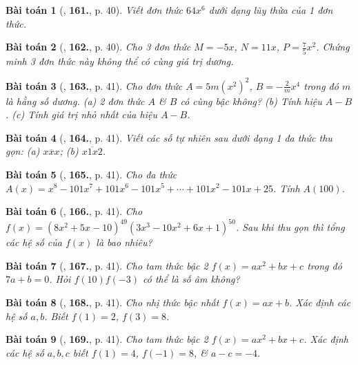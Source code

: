 \documentclass{article}
\numberwithin{equation}{section}
\newtheorem{baitoan}{Bài toán}
\begin{document}
\begin{baitoan}[\cite{Tuyen_Toan_7}, \textbf{161.}, p. 40]
	Viết đơn thức $64x^6$ dưới dạng lũy thừa của 1 đơn thức.
\end{baitoan}

\begin{baitoan}[\cite{Tuyen_Toan_7}, \textbf{162.}, p. 40]
	Cho 3 đơn thức $M = -5x$, $N = 11x$, $P = \frac{7}{5}x^2$. Chứng minh 3 đơn thức này không thể có cùng giá trị dương.
\end{baitoan}

\begin{baitoan}[\cite{Tuyen_Toan_7}, \textbf{163.}, p. 41]
	Cho đơn thức $A = 5m(x^2)^2$, $B = -\frac{2}{m}x^4$ trong đó $m$ là hằng số dương. (a) 2 đơn thức $A$ \& $B$ có cùng bậc không? (b) Tính hiệu $A - B$. (c) Tính giá trị nhỏ nhất của hiệu $A - B$.
\end{baitoan}

\begin{baitoan}[\cite{Tuyen_Toan_7}, \textbf{164.}, p. 41]
	Viết các số tự nhiên sau dưới dạng 1 đa thức thu gọn: (a) $\overline{xxx}$; (b) $\overline{x1x2}$.
\end{baitoan}

\begin{baitoan}[\cite{Tuyen_Toan_7}, \textbf{165.}, p. 41]
	Cho đa thức $A(x) = x^8 - 101x^7 + 101x^6 - 101x^5 + \cdots + 101x^2 - 101x + 25$. Tính $A(100)$.
\end{baitoan}

\begin{baitoan}[\cite{Tuyen_Toan_7}, \textbf{166.}, p. 41]
	Cho $f(x) = (8x^2 + 5x - 10)^{49}(3x^3 - 10x^2 + 6x + 1)^{50}$. Sau khi thu gọn thì tổng các hệ số của $f(x)$ là bao nhiêu?
\end{baitoan}

\begin{baitoan}[\cite{Tuyen_Toan_7}, \textbf{167.}, p. 41]
	Cho tam thức bậc 2 $f(x) = ax^2 + bx + c$ trong đó $7a + b = 0$. Hỏi $f(10)f(-3)$ có thể là số âm không?
\end{baitoan}

\begin{baitoan}[\cite{Tuyen_Toan_7}, \textbf{168.}, p. 41]
	Cho nhị thức bậc nhất $f(x) = ax + b$. Xác định các hệ số $a,b$. Biết $f(1) = 2$, $f(3) = 8$.
\end{baitoan}

\begin{baitoan}[\cite{Tuyen_Toan_7}, \textbf{169.}, p. 41]
	Cho tam thức bậc 2 $f(x) = ax^2 + bx + c$. Xác định các hệ số $a,b,c$ biết $f(1) = 4$, $f(-1) = 8$, \& $a - c = -4$.
\end{baitoan}
\end{document}
